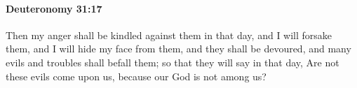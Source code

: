 
		\paragraph{Deuteronomy 31:17} %
			\label{DEUTERONOMY-31-17}

			Then my anger shall be kindled against them in that day, and I will forsake them, and I will hide my face from them, and they shall be devoured, and many evils and troubles shall befall them; so that they will say in that day, Are not these evils come upon us, because our God is not among us?


